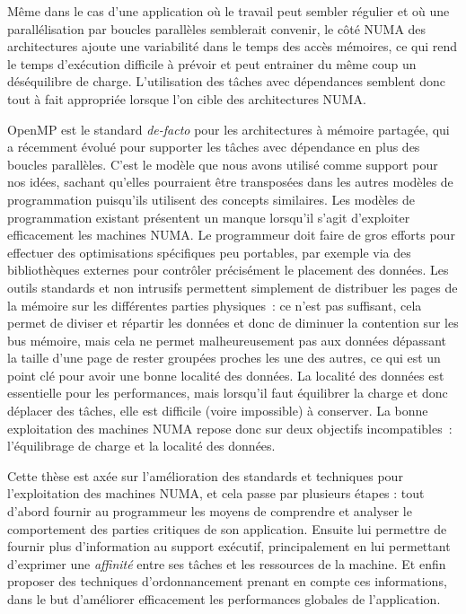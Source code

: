Même dans le cas d'une application où le travail peut sembler régulier et où une parallélisation par boucles parallèles semblerait convenir, le côté NUMA des architectures ajoute une variabilité dans le temps des accès mémoires, ce qui rend le temps d'exécution difficile à prévoir et peut entrainer du même coup un déséquilibre de charge.
L'utilisation des tâches avec dépendances semblent donc tout à fait appropriée lorsque l'on cible des architectures NUMA.

OpenMP est le standard \emph{de-facto} pour les architectures à mémoire partagée, qui a récemment évolué pour supporter les tâches avec dépendance en plus des boucles parallèles.
C'est le modèle que nous avons utilisé comme support pour nos idées, sachant qu'elles pourraient être transposées dans les autres modèles de programmation puisqu'ils utilisent des concepts similaires.
Les modèles de programmation existant présentent un manque lorsqu'il s'agit d'exploiter efficacement les machines NUMA.
Le programmeur doit faire de gros efforts pour effectuer des optimisations spécifiques peu portables, par exemple via des bibliothèques externes pour contrôler précisément le placement des données.
Les outils standards et non intrusifs permettent simplement de distribuer les pages de la mémoire sur les différentes parties physiques~: ce n'est pas suffisant, cela permet de diviser et répartir les données et donc de diminuer la contention sur les bus mémoire, mais cela ne permet malheureusement pas aux données dépassant la taille d'une page de rester groupées proches les une des autres, ce qui est un point clé pour avoir une bonne localité des données.
La localité des données est essentielle pour les performances, mais lorsqu'il faut équilibrer la charge et donc déplacer des tâches, elle est difficile (voire impossible) à conserver.
La bonne exploitation des machines NUMA repose donc sur deux objectifs incompatibles~: l'équilibrage de charge et la localité des données.

Cette thèse est axée sur l'amélioration des standards et techniques pour l'exploitation des machines NUMA, et cela passe par plusieurs étapes : tout d'abord fournir au programmeur les moyens de comprendre et analyser le comportement des parties critiques de son application.
Ensuite lui permettre de fournir plus d'information au support exécutif, principalement en lui permettant d'exprimer une \emph{affinité} entre ses tâches et les ressources de la machine.
Et enfin proposer des techniques d'ordonnancement prenant en compte ces informations, dans le but d'améliorer efficacement les performances globales de l'application.







